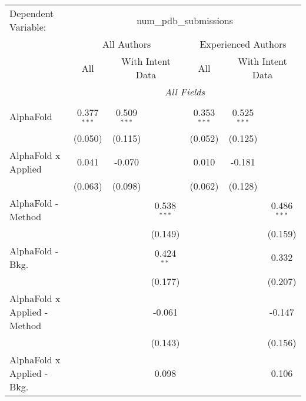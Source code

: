 \begingroup
\centering
\begin{tabular}{lcccccc}
   \tabularnewline \midrule \midrule
   Dependent Variable: & \multicolumn{6}{c}{num\_pdb\_submissions}\\
 & \multicolumn{3}{c}{All Authors} & \multicolumn{3}{c}{Experienced Authors} \\
\cmidrule(lr){2-4} \cmidrule(lr){5-7}
 & \multicolumn{1}{c}{All} & \multicolumn{2}{c}{With Intent Data} & \multicolumn{1}{c}{All} & \multicolumn{2}{c}{With Intent Data} \\
\cmidrule(lr){2-2} \cmidrule(lr){3-4} \cmidrule(lr){5-5} \cmidrule(lr){6-7}
 & \multicolumn{6}{c}{\textit{All Fields}} \\ \\
   AlphaFold                      & 0.377$^{***}$  & 0.509$^{***}$ &               & 0.353$^{***}$  & 0.525$^{***}$ &   \\   
                                  & (0.050)        & (0.115)       &               & (0.052)        & (0.125)       &   \\   
   AlphaFold x Applied            & 0.041          & -0.070        &               & 0.010          & -0.181        &   \\   
                                  & (0.063)        & (0.098)       &               & (0.062)        & (0.128)       &   \\   
   AlphaFold - Method             &                &               & 0.538$^{***}$ &                &               & 0.486$^{***}$\\   
                                  &                &               & (0.149)       &                &               & (0.159)\\   
   AlphaFold - Bkg.               &                &               & 0.424$^{**}$  &                &               & 0.332\\   
                                  &                &               & (0.177)       &                &               & (0.207)\\   
   AlphaFold x Applied - Method   &                &               & -0.061        &                &               & -0.147\\   
                                  &                &               & (0.143)       &                &               & (0.156)\\   
   AlphaFold x Applied - Bkg.     &                &               & 0.098         &                &               & 0.106\\   

\end{tabular}
